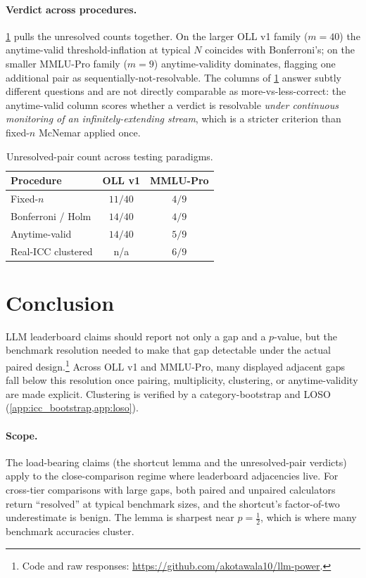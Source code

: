 \documentclass{article}
\theoremstyle{plain}
\theoremstyle{definition}
\begin{document}
\paragraph{Verdict across procedures.} \cref{tab:verdict} pulls the unresolved counts together. On the larger OLL v1 family ($m{=}40$) the anytime-valid threshold-inflation at typical $N$ coincides with Bonferroni's; on the smaller MMLU-Pro family ($m{=}9$) anytime-validity dominates, flagging one additional pair as sequentially-not-resolvable. The columns of \cref{tab:verdict} answer subtly different questions and are not directly comparable as more-vs-less-correct: the anytime-valid column scores whether a verdict is resolvable \emph{under continuous monitoring of an infinitely-extending stream}, which is a stricter criterion than fixed-$n$ McNemar applied once.

\begin{table}[t]
\caption{Unresolved-pair count across testing paradigms.}
\label{tab:verdict}
\centering\footnotesize
\setlength{\tabcolsep}{4pt}
\begin{tabular}{@{}lcc@{}}
\toprule
Procedure & OLL v1 & MMLU-Pro \\
\midrule
Fixed-$n$              & $11/40$ & $4/9$ \\
Bonferroni / Holm      & $14/40$ & $4/9$ \\
Anytime-valid          & $14/40$ & $5/9$ \\
Real-ICC clustered     & n/a     & $6/9$ \\
\bottomrule
\end{tabular}
\end{table}

\section{Conclusion}
\label{sec:conclusion}

LLM leaderboard claims should report not only a gap and a $p$-value, but the benchmark resolution needed to make that gap detectable under the actual paired design.\footnote[2]{Code and raw responses: \url{https://github.com/akotawala10/llm-power}.} Across OLL v1 and MMLU-Pro, many displayed adjacent gaps fall below this resolution once pairing, multiplicity, clustering, or anytime-validity are made explicit. Clustering is verified by a category-bootstrap and LOSO (\cref{app:icc_bootstrap,app:loso}).

\paragraph{Scope.} The load-bearing claims (the shortcut lemma and the unresolved-pair verdicts) apply to the close-comparison regime where leaderboard adjacencies live. For cross-tier comparisons with large gaps, both paired and unpaired calculators return ``resolved'' at typical benchmark sizes, and the shortcut's factor-of-two underestimate is benign. The lemma is sharpest near $p{=}\tfrac12$, which is where many benchmark accuracies cluster.
\end{document}
